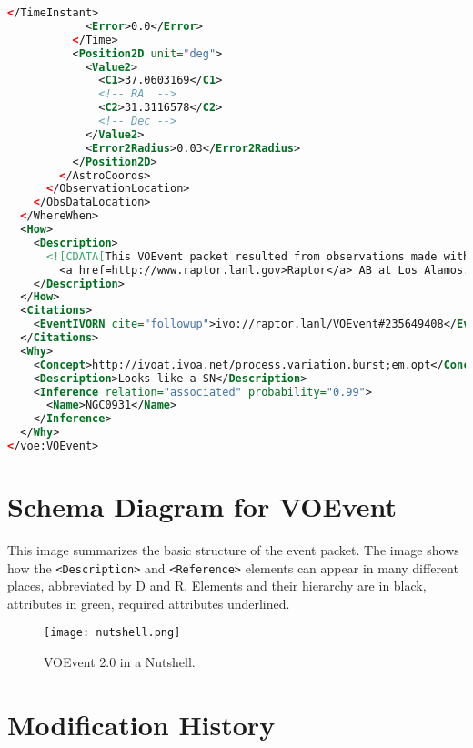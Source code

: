 \documentclass[11pt,a4paper]{ivoa}
\begin{document}
\begin{lstlisting}[language=XML]
            </TimeInstant>
            <Error>0.0</Error>
          </Time>
          <Position2D unit="deg">
            <Value2>
              <C1>37.0603169</C1>
              <!-- RA  -->
              <C2>31.3116578</C2>
              <!-- Dec -->
            </Value2>
            <Error2Radius>0.03</Error2Radius>
          </Position2D>
        </AstroCoords>
      </ObservationLocation>
    </ObsDataLocation>
  </WhereWhen>
  <How>
    <Description>
      <![CDATA[This VOEvent packet resulted from observations made with
        <a href=http://www.raptor.lanl.gov>Raptor</a> AB at Los Alamos. ]]>
    </Description>
  </How>
  <Citations>
    <EventIVORN cite="followup">ivo://raptor.lanl/VOEvent#235649408</EventIVORN>
  </Citations>
  <Why>
    <Concept>http://ivoat.ivoa.net/process.variation.burst;em.opt</Concept>
    <Description>Looks like a SN</Description>
    <Inference relation="associated" probability="0.99">
      <Name>NGC0931</Name>
    </Inference>
  </Why>
</voe:VOEvent>
\end{lstlisting}

\section{Schema Diagram for VOEvent}
\label{sec:5}
This image summarizes the basic structure of the event packet. The image shows
how the {\tt <Description>} and {\tt <Reference>} elements can appear in many
different places, abbreviated by D and R. Elements and their hierarchy are in
black, attributes in green, required attributes underlined.
\begin{figure}[th]
\begin{center}
\texttt{[image: nutshell.png]} \end{center}
\caption{VOEvent 2.0 in a Nutshell.}
\label{fig:nutshell}
\end{figure}





\appendix

\section{Modification History}
\end{document}
